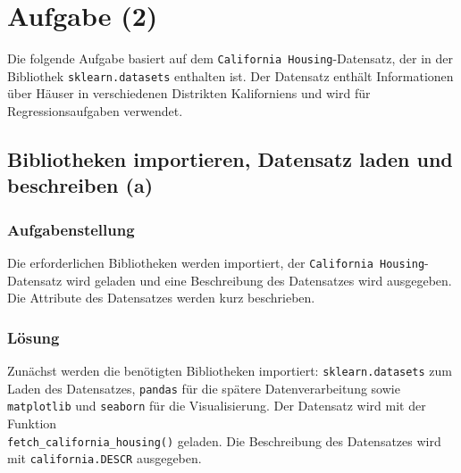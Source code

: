 
\chapter{Aufgabe (2)}
\label{chap:Aufgabe2}
\thispagestyle{fancy}

Die folgende Aufgabe basiert auf dem \texttt{California Housing}-Datensatz, der in der Bibliothek \texttt{sklearn.datasets} enthalten ist. Der Datensatz enthält Informationen über Häuser in verschiedenen Distrikten Kaliforniens und wird für Regressionsaufgaben verwendet.


\section{Bibliotheken importieren, Datensatz laden und beschreiben (a)}
\label{sec:2a}

\subsection{Aufgabenstellung}

Die erforderlichen Bibliotheken werden importiert, der \texttt{California Housing}-Datensatz wird geladen und eine Beschreibung des Datensatzes wird ausgegeben. Die Attribute des Datensatzes werden kurz beschrieben.

\subsection{Lösung}

Zunächst werden die benötigten Bibliotheken importiert: \texttt{sklearn.datasets} zum Laden des Datensatzes, \texttt{pandas} für die spätere Datenverarbeitung sowie \texttt{matplotlib} und \texttt{seaborn} für die Visualisierung. Der Datensatz wird mit der Funktion \\ \texttt{fetch\_california\_housing()} geladen. Die Beschreibung des Datensatzes wird mit \texttt{california.DESCR} ausgegeben.



